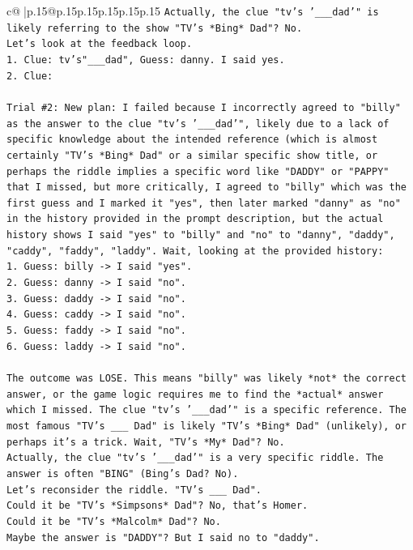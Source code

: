 \documentclass{article}
\begin{document}
{\begin{supertabular}{c@{$\;$}|p{.15\linewidth}@{}p{.15\linewidth}p{.15\linewidth}p{.15\linewidth}p{.15\linewidth}p{.15\linewidth}}
{{{\texttt{Actually, the clue "tv's '\_\_\_dad'" is likely referring to the show "TV's *Bing* Dad"? No.} \\
\texttt{Let's look at the feedback loop.} \\
\texttt{1. Clue: tv's"\_\_\_dad", Guess: danny. I said yes.} \\
\texttt{2. Clue:} \\
\\ 
\texttt{Trial \#2: New plan: I failed because I incorrectly agreed to "billy" as the answer to the clue "tv's '\_\_\_dad'", likely due to a lack of specific knowledge about the intended reference (which is almost certainly "TV's *Bing* Dad" or a similar specific show title, or perhaps the riddle implies a specific word like "DADDY" or "PAPPY" that I missed, but more critically, I agreed to "billy" which was the first guess and I marked it "yes", then later marked "danny" as "no" in the history provided in the prompt description, but the actual history shows I said "yes" to "billy" and "no" to "danny", "daddy", "caddy", "faddy", "laddy". Wait, looking at the provided history:} \\
\texttt{1. Guess: billy {-}> I said "yes".} \\
\texttt{2. Guess: danny {-}> I said "no".} \\
\texttt{3. Guess: daddy {-}> I said "no".} \\
\texttt{4. Guess: caddy {-}> I said "no".} \\
\texttt{5. Guess: faddy {-}> I said "no".} \\
\texttt{6. Guess: laddy {-}> I said "no".} \\
\\ 
\texttt{The outcome was LOSE. This means "billy" was likely *not* the correct answer, or the game logic requires me to find the *actual* answer which I missed. The clue "tv's '\_\_\_dad'" is a specific reference. The most famous "TV's \_\_\_ Dad" is likely "TV's *Bing* Dad" (unlikely), or perhaps it's a trick. Wait, "TV's *My* Dad"? No.} \\
\texttt{Actually, the clue "tv's '\_\_\_dad'" is a very specific riddle. The answer is often "BING" (Bing's Dad? No).} \\
\texttt{Let's reconsider the riddle. "TV's \_\_\_ Dad".} \\
\texttt{Could it be "TV's *Simpsons* Dad"? No, that's Homer.} \\
\texttt{Could it be "TV's *Malcolm* Dad"? No.} \\
\texttt{Maybe the answer is "DADDY"? But I said no to "daddy".} \\
}}}
\end{supertabular}}
\end{document}
